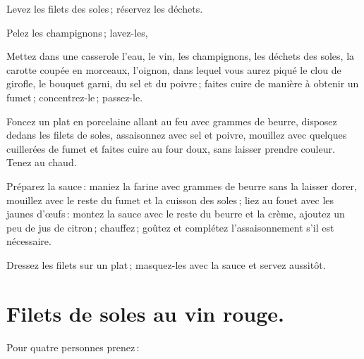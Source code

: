 Levez les filets des soles ; réservez les déchets.

Pelez les champignons ; lavez-les,

Mettez dans une casserole l'eau, le vin, les champignons, les déchets des
soles, la carotte coupée en morceaux, l'oignon, dans lequel vous aurez piqué le
clou de girofle, le bouquet garni, du sel et du poivre ; faites cuire de
manière à obtenir un fumet ; concentrez-le ; passez-le.

Foncez un plat en porcelaine allant au feu avec {\mmm} grammes de beurre, disposez
dedans les filets de soles, assaisonnez avec sel et poivre, mouillez avec quelques
cuillerées de fumet et faites cuire au four doux, sans laisser prendre couleur.
Tenez au chaud.

Préparez la sauce : maniez la farine avec {\mmm} grammes de beurre sans la laisser
dorer, mouillez avec le reste du fumet et la cuisson des soles ; liez au fouet
avec les jaunes d'œufs : montez la sauce avec le reste du beurre et la crème,
ajoutez un peu de jus de citron ; chauffez ; goûtez et complétez
l’assaisonnement s'il est nécessaire.

Dressez les filets sur un plat ; masquez-les avec la sauce et servez aussitôt.

\section*{\centering Filets de soles au vin rouge.}

Pour quatre personnes prenez :

\medskip

